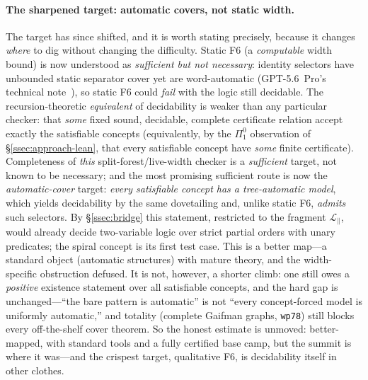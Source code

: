 \documentclass[11pt]{article}
\theoremstyle{plain}
\theoremstyle{definition}
\begin{document}
\paragraph{The sharpened target: automatic covers, not static width.} The
target has since shifted, and it is worth stating precisely, because it
changes \emph{where} to dig without changing the difficulty. Static F6 (a
\emph{computable} width bound) is now understood as \emph{sufficient but not
necessary}: identity selectors have unbounded static
separator cover yet are word-automatic (GPT-5.6~Pro's technical
note~\cite{GPT56TechNote}), so static F6 could
\emph{fail} with the logic still decidable. The recursion-theoretic
\emph{equivalent} of decidability is weaker than any particular checker:
that \emph{some} fixed sound, decidable, complete certificate relation
accept exactly the satisfiable concepts (equivalently, by the $\Pi^0_1$
observation of \S\ref{ssec:approach-lean}, that every satisfiable concept
have \emph{some} finite certificate). Completeness of \emph{this}
split-forest/live-width checker is a \emph{sufficient} target, not known
to be necessary; and the most promising sufficient route is now the
\emph{automatic-cover} target: \emph{every satisfiable concept has a
tree-automatic model}, which yields decidability by the same dovetailing and,
unlike static F6, \emph{admits} such selectors. By \S\ref{ssec:bridge} this
statement, restricted to the fragment $\mathcal L_{\parallel}$, would already
decide two-variable logic over strict partial orders with unary predicates;
the spiral concept is its first test case. This is a better
map---a standard object (automatic structures) with mature theory, and the
width-specific obstruction defused. It is not, however, a shorter climb: one
still owes a \emph{positive} existence statement over all satisfiable
concepts, and the hard gap is unchanged---``the bare pattern is automatic''
is not ``every concept-forced model is uniformly automatic,'' and totality
(complete Gaifman graphs, \texttt{wp78}) still blocks every off-the-shelf
cover theorem. So the honest estimate is unmoved: better-mapped, with standard
tools and a fully certified base camp, but the summit is where it was---and
the crispest target, qualitative F6, is decidability itself in other clothes.
\end{document}

